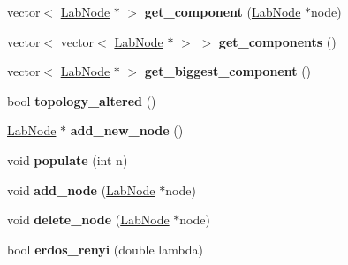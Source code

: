 \begin{DoxyCompactItemize}
\item 
\hypertarget{classelps_1_1_lab_network_ac79ded8681bf28c47e6cf96cd63e99e8}{vector$<$ \hyperlink{classelps_1_1_lab_node}{Lab\-Node} $\ast$ $>$ {\bfseries get\-\_\-component} (\hyperlink{classelps_1_1_lab_node}{Lab\-Node} $\ast$node)}\label{classelps_1_1_lab_network_ac79ded8681bf28c47e6cf96cd63e99e8}

\item 
\hypertarget{classelps_1_1_lab_network_ac4a41e6f41e95d073a42cab3a357d030}{vector$<$ vector$<$ \hyperlink{classelps_1_1_lab_node}{Lab\-Node} $\ast$ $>$ $>$ {\bfseries get\-\_\-components} ()}\label{classelps_1_1_lab_network_ac4a41e6f41e95d073a42cab3a357d030}

\item 
\hypertarget{classelps_1_1_lab_network_a72ded20fa3d56291345f5ac2f39b36b5}{vector$<$ \hyperlink{classelps_1_1_lab_node}{Lab\-Node} $\ast$ $>$ {\bfseries get\-\_\-biggest\-\_\-component} ()}\label{classelps_1_1_lab_network_a72ded20fa3d56291345f5ac2f39b36b5}

\item 
\hypertarget{classelps_1_1_lab_network_ac5b367d91c20a12d04785c761af5ddfe}{bool {\bfseries topology\-\_\-altered} ()}\label{classelps_1_1_lab_network_ac5b367d91c20a12d04785c761af5ddfe}

\item 
\hypertarget{classelps_1_1_lab_network_ae139a0189795b1aac81603e6f0c77552}{\hyperlink{classelps_1_1_lab_node}{Lab\-Node} $\ast$ {\bfseries add\-\_\-new\-\_\-node} ()}\label{classelps_1_1_lab_network_ae139a0189795b1aac81603e6f0c77552}

\item 
\hypertarget{classelps_1_1_lab_network_abfcc00d0a03112965c3ba30e3242d0de}{void {\bfseries populate} (int n)}\label{classelps_1_1_lab_network_abfcc00d0a03112965c3ba30e3242d0de}

\item 
\hypertarget{classelps_1_1_lab_network_a5b65d747d6a1c1d0748cfb3f5ba36881}{void {\bfseries add\-\_\-node} (\hyperlink{classelps_1_1_lab_node}{Lab\-Node} $\ast$node)}\label{classelps_1_1_lab_network_a5b65d747d6a1c1d0748cfb3f5ba36881}

\item 
\hypertarget{classelps_1_1_lab_network_a43d8a7a102e8871a9833cfa296517e10}{void {\bfseries delete\-\_\-node} (\hyperlink{classelps_1_1_lab_node}{Lab\-Node} $\ast$node)}\label{classelps_1_1_lab_network_a43d8a7a102e8871a9833cfa296517e10}

\item 
\hypertarget{classelps_1_1_lab_network_a8103b2a550fac2cc0a54e7ac54911407}{bool {\bfseries erdos\-\_\-renyi} (double lambda)}\label{classelps_1_1_lab_network_a8103b2a550fac2cc0a54e7ac54911407}


\end{DoxyCompactItemize}

